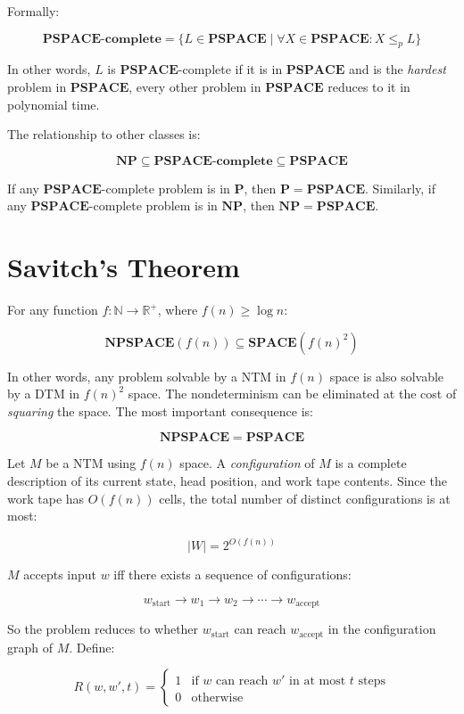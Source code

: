 \documentclass[12pt,a4paper,openany]{article}
\begin{document}
Formally:

\[
\mathbf{PSPACE\text{-}complete} = \{ L \in \mathbf{PSPACE} \mid \forall X \in \mathbf{PSPACE}: X \leq_p L \}
\]

In other words, $L$ is $\mathbf{PSPACE}$-complete if it is in $\mathbf{PSPACE}$ and is the \emph{hardest}
problem in $\mathbf{PSPACE}$, every other problem in $\mathbf{PSPACE}$ reduces to it in polynomial time.

The relationship to other classes is:

\[
\mathbf{NP} \subseteq \mathbf{PSPACE\text{-}complete} \subseteq \mathbf{PSPACE}
\]

If any $\mathbf{PSPACE}$-complete problem is in $\mathbf{P}$, then $\mathbf{P} = \mathbf{PSPACE}$.
Similarly, if any $\mathbf{PSPACE}$-complete problem is in $\mathbf{NP}$, then $\mathbf{NP} = \mathbf{PSPACE}$.

\section{Savitch's Theorem}

For any function $f: \mathbb{N} \to \mathbb{R}^+$, where $f(n) \geq \log n$:

\[
\mathbf{NPSPACE}(f(n)) \subseteq \mathbf{SPACE}(f(n)^2)
\]

\noindent In other words, any problem solvable by a NTM in $f(n)$ space is also solvable
by a DTM in $f(n)^2$ space. The nondeterminism can be eliminated at the cost of
\emph{squaring} the space. The most important consequence is:

\[
\mathbf{NPSPACE}= \mathbf{PSPACE}
\]


Let $M$ be a NTM using $f(n)$ space. A \emph{configuration} of $M$ is a complete
description of its current state, head position, and work tape contents. Since the work
tape has $O(f(n))$ cells, the total number of distinct configurations is at most:

\[
|W| = 2^{O(f(n))}
\]

$M$ accepts input $w$ iff there exists a sequence of configurations:

\[
w_{\mathrm{start}} \to w_1 \to w_2 \to \cdots \to w_{\mathrm{accept}}
\]

So the problem reduces to whether $w_{\mathrm{start}}$ can reach $w_{\mathrm{accept}}$
in the configuration graph of $M$. Define:

\[
R(w, w', t) = \begin{cases} 1 & \text{if } w \text{ can reach } w' \text{ in at most } t \text{ steps} \\ 0 & \text{otherwise} \end{cases}
\]
\end{document}
